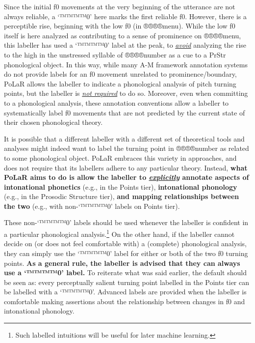 \documentclass[11pt, twoside]{memoir}
\begin{document}
Since the initial f0 movements at the very beginning of the utterance are not always reliable, a ‘™™™™{0}’ here marks the first reliable f0. However, there is a perceptible rise, beginning with the low f0 (in ®®®®{menu}). While the low f0 itself is here analyzed as contributing to a sense of prominence on ®®®®{menu}, this labeller has used a ‘™™™™{0}’ label at the peak, to \textit{\uline{avoid}} analyzing the rise to the high in the unstressed syllable of ®®®®{number} as a cue to a PrStr phonological object. In this way, while many A-M framework annotation systems do not provide labels for an f0 movement unrelated to prominence\slash boundary, PoLaR allows the labeller to indicate a phonological analysis of pitch turning points, but the labeller is \textit{\uline{not required}} to do so. Moreover, even when committing to a phonological analysis, these annotation conventions allow a labeller to systematically label f0 movements that are not predicted by the current state of their chosen phonological theory.

It is possible that a different labeller with a different set of theoretical tools and analyses might indeed want to label the turning point in ®®®®{number} as related to some phonological object. PoLaR embraces this variety in approaches, and does not require that its labellers adhere to any particular theory. Instead, \textbf{what PoLaR aims to do is allow the labeller to \textit{\uline{explicitly}} annotate aspects of intonational phonetics} (e.g., in the Points tier), \textbf{intonational phonology} (e.g., in the Prosodic Structure tier), \textbf{and mapping relationships between the two} (e.g., with non-‘™™™™{0}’ labels on Points tier).

These non-‘™™™™{0}’ labels should be used whenever the labeller is confident in a particular phonological analysis.\footnote{Such labelled intuitions will be useful for later machine learning.} On the other hand, if the labeller cannot decide on (or does not feel comfortable with) a (complete) phonological analysis, they can simply use the ‘™™™™{0}’ label for either or both of the two f0 turning points. \textbf{As a general rule, the labeller is advised that they can always use a ‘™™™™{0}’ label.} To reiterate what was said earlier, the default should be seen as: every perceptually salient turning point labelled in the Points tier can be labelled with a ‘™™™™{0}’. Advanced labels are provided when the labeller is comfortable making assertions about the relationship between changes in f0 and intonational phonology.
\end{document}
